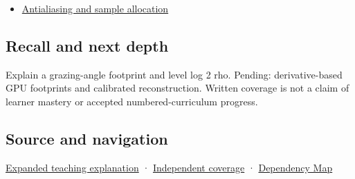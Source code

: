 \begin{itemize}
\tightlist
\item
  \hyperref[appendix-4192b2bdd21e]{Antialiasing and sample allocation}
\end{itemize}

\subsection{Recall and next depth}\label{appendix-b677a85ba76f-recall-and-next-depth}

Explain a grazing-angle footprint and level log 2 rho. Pending: derivative-based GPU footprints and calibrated reconstruction. Written coverage is not a claim of learner mastery or accepted numbered-curriculum progress.

\subsection{Source and navigation}\label{appendix-b677a85ba76f-source-and-navigation}

\hyperref[04-visual-computing-ii-ch042-multiresolution-work-must-preserve-the-right-information]{Expanded teaching explanation} · \hyperref[appendix-fd090d982a15-xr01---independent-seeing-and-representation-source]{Independent coverage} · \hyperref[appendix-4ad47bdd269a]{Dependency Map}
